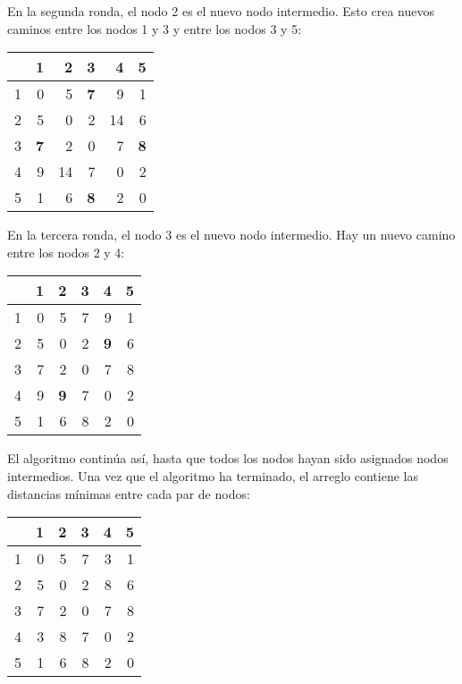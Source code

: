 En la segunda ronda, el nodo 2 es el nuevo nodo intermedio.
Esto crea nuevos caminos entre los nodos 1 y 3 y entre los nodos 3 y 5:

\begin{center}
    \begin{tabular}{r|rrrrr}
          & 1          & 2  & 3          & 4  & 5          \\
        \hline
        1 & 0          & 5  & \textbf{7} & 9  & 1          \\
        2 & 5          & 0  & 2          & 14 & 6          \\
        3 & \textbf{7} & 2  & 0          & 7  & \textbf{8} \\
        4 & 9          & 14 & 7          & 0  & 2          \\
        5 & 1          & 6  & \textbf{8} & 2  & 0          \\
    \end{tabular}
\end{center}
\vspace{10pt}

En la tercera ronda, el nodo 3 es el nuevo nodo intermedio. Hay un
nuevo camino entre los nodos 2 y 4:
\begin{center}
    \begin{tabular}{r|rrrrr}
          & 1 & 2          & 3 & 4          & 5 \\
        \hline
        1 & 0 & 5          & 7 & 9          & 1 \\
        2 & 5 & 0          & 2 & \textbf{9} & 6 \\
        3 & 7 & 2          & 0 & 7          & 8 \\
        4 & 9 & \textbf{9} & 7 & 0          & 2 \\
        5 & 1 & 6          & 8 & 2          & 0 \\
    \end{tabular}
\end{center}
\vspace{10pt}

El algoritmo continúa así, hasta que todos los nodos hayan sido
asignados nodos intermedios. Una vez que el algoritmo ha terminado,
el arreglo contiene las distancias mínimas entre cada par de nodos:

\begin{center}
    \begin{tabular}{r|rrrrr}
          & 1 & 2 & 3 & 4 & 5 \\
        \hline
        1 & 0 & 5 & 7 & 3 & 1 \\
        2 & 5 & 0 & 2 & 8 & 6 \\
        3 & 7 & 2 & 0 & 7 & 8 \\
        4 & 3 & 8 & 7 & 0 & 2 \\
        5 & 1 & 6 & 8 & 2 & 0 \\
    \end{tabular}
\end{center}

